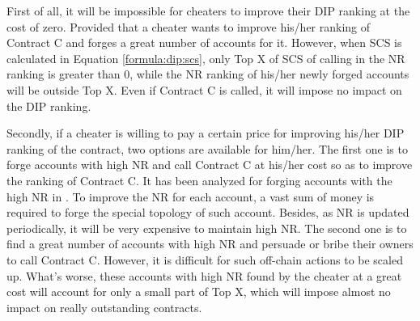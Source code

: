 First of all, it will be impossible for cheaters to improve their DIP ranking at the cost of zero. Provided that a cheater wants to improve his/her ranking of Contract C and forges a great number of accounts for it. However, when SCS is calculated in Equation \ref{formula:dip:scs}, only Top X of SCS of calling in the NR ranking is greater than 0, while the NR ranking of his/her newly forged accounts will be outside Top X. Even if Contract C is called, it will impose no impact on the DIP ranking.

Secondly, if a cheater is willing to pay a certain price for improving his/her DIP ranking of the contract, two options are available for him/her. The first one is to forge accounts with high NR and call Contract C at his/her cost so as to improve the ranking of Contract C. It has been analyzed for forging accounts with the high NR in . To improve the NR for each account, a vast sum of money is required to forge the special topology of such account. Besides, as NR is updated periodically, it will be very expensive to maintain high NR. The second one is to find a great number of accounts with high NR and persuade or bribe their owners to call Contract C. However, it is difficult for such off-chain actions to be scaled up. What's worse, these accounts with high NR found by the cheater at a great cost will account for only a small part of Top X, which will impose almost no impact on really outstanding contracts.